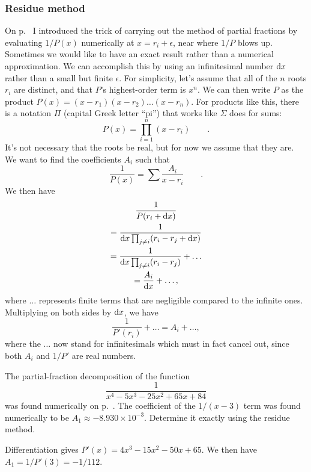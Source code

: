 \subsubsection{Residue method}
On p.~\pageref{residue-method-numerical} I introduced the trick of carrying out the method of partial fractions
by evaluating $1/P(x)$ numerically at $x=r_i+\epsilon$, near where $1/P$ blows up. Sometimes we would like
to have an exact result rather than a numerical approximation. We can accomplish this by using an infinitesimal
number $\textup{d} x$ rather than a small but finite $\epsilon$. For simplicity, let's assume that all of the $n$ roots $r_i$
are distinct, and that $P$'s highest-order term is $x^n$. We can then write $P$ as the product 
$P(x)=(x-r_1)(x-r_2)\ldots(x-r_n)$. For products like this, there is a notation $\Pi$ (capital Greek letter ``pi'')
that works like $\Sigma$ does for sums: 
\begin{equation*}
  P(x)=\prod_{i=1}^n(x-r_i) \qquad .
\end{equation*}
It's not necessary that the roots be real, but for now we assume that they are.
We want to find the coefficients $A_i$ such that
\begin{equation*}
  \frac{1}{P(x)} = \sum \frac{A_i}{x-r_i} \qquad .
\end{equation*}
We then have
\begin{gather*}
  \frac{1}{P(r_i+\textup{d} x)} \\
          = \frac{1}{\textup{d} x \prod_{j\ne i}(r_i-r_j+\textup{d} x)} \\
          = \frac{1}{\textup{d} x \prod_{j\ne i}(r_i-r_j)} + \ldots \\
          = \frac{A_i}{\textup{d} x}+\ldots ,
\end{gather*}
where $\ldots$ represents finite terms that are negligible compared to the infinite ones. Multiplying on
both sides by $\textup{d} x$, we have
\begin{equation*}
  \frac{1}{P'(r_i)} + \ldots = A_i + \ldots ,
\end{equation*}
where the $\ldots$ now stand for infinitesimals which must in fact cancel out, since both $A_i$ and
$1/P'$ are real numbers.

\begin{eg}
\egquestion The partial-fraction decomposition of the function
\begin{equation*}
\frac{1}{x^4-5x^3-25x^2+65x+84}
\end{equation*}
was found numerically on p.~\pageref{partial-fractions-numerical}. The coefficient
of the $1/(x-3)$ term was found numerically to be $A_1\approx -8.930\times10^{-3}$.
Determine it exactly using the residue method.

\eganswer
Differentiation gives $P'(x)=4x^3-15x^2-50x+65$. We then have
$A_1=1/P'(3)=-1/112$.

\end{eg}

